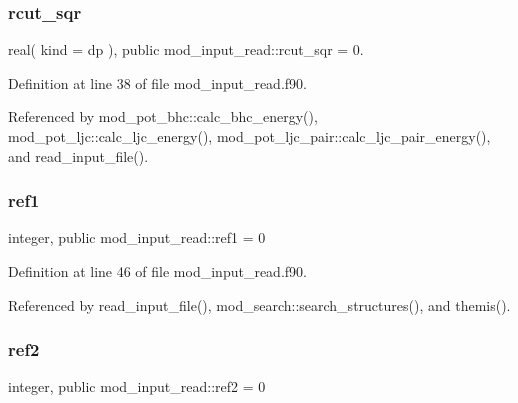 \mbox{\label{namespacemod__input__read_ad2ddb7a8a7af94da8a7d12c6e3ab9899}} 
\subsubsection{\texorpdfstring{rcut\+\_\+sqr}{rcut\_sqr}}
{\footnotesize\ttfamily real( kind = dp ), public mod\+\_\+input\+\_\+read\+::rcut\+\_\+sqr = 0.}



Definition at line 38 of file mod\+\_\+input\+\_\+read.\+f90.



Referenced by mod\+\_\+pot\+\_\+bhc\+::calc\+\_\+bhc\+\_\+energy(), mod\+\_\+pot\+\_\+ljc\+::calc\+\_\+ljc\+\_\+energy(), mod\+\_\+pot\+\_\+ljc\+\_\+pair\+::calc\+\_\+ljc\+\_\+pair\+\_\+energy(), and read\+\_\+input\+\_\+file().

\mbox{\label{namespacemod__input__read_ae009fc7ba8243327aec0bed57f18b515}} 
\subsubsection{\texorpdfstring{ref1}{ref1}}
{\footnotesize\ttfamily integer, public mod\+\_\+input\+\_\+read\+::ref1 = 0}



Definition at line 46 of file mod\+\_\+input\+\_\+read.\+f90.



Referenced by read\+\_\+input\+\_\+file(), mod\+\_\+search\+::search\+\_\+structures(), and themis().

\mbox{\label{namespacemod__input__read_a72ae0812ca16c5cbb7eb3cbe12bafb58}} 
\subsubsection{\texorpdfstring{ref2}{ref2}}
{\footnotesize\ttfamily integer, public mod\+\_\+input\+\_\+read\+::ref2 = 0}



